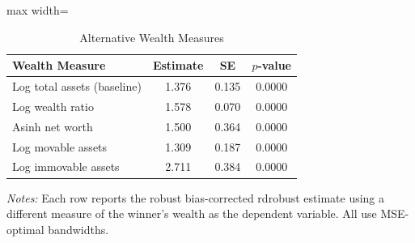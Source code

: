 \begin{table}[htbp]
\centering
\caption{Alternative Wealth Measures}
\label{tab:alt_wealth}
\begin{adjustbox}{max width=\textwidth}
\begin{tabular}{lccc}
\hline\hline
Wealth Measure & Estimate & SE & $p$-value \\
\hline
Log total assets (baseline) & 1.376 & 0.135 & 0.0000 \\
Log wealth ratio & 1.578 & 0.070 & 0.0000 \\
Asinh net worth & 1.500 & 0.364 & 0.0000 \\
Log movable assets & 1.309 & 0.187 & 0.0000 \\
Log immovable assets & 2.711 & 0.384 & 0.0000 \\
\hline\hline
\end{tabular}
\end{adjustbox}
\begin{minipage}{0.95\textwidth}
\footnotesize
\textit{Notes:} Each row reports the robust bias-corrected rdrobust estimate using a different measure of the winner's wealth as the dependent variable. All use MSE-optimal bandwidths.
\end{minipage}
\end{table}
